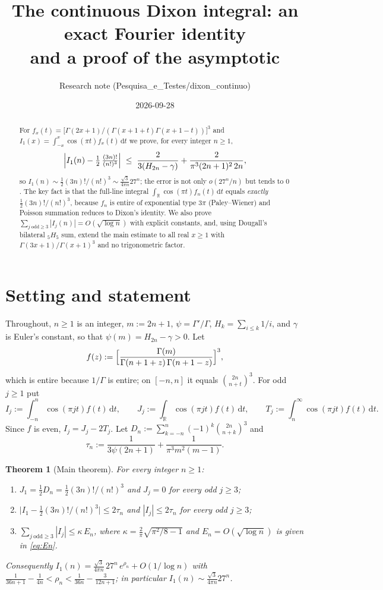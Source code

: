 \documentclass[11pt]{amsart}
\title{The continuous Dixon integral: an exact Fourier identity\\ and a proof of the asymptotic}
\author{Research note (Pesquisa\_e\_Testes/dixon\_continuo)}
\date{2026-09-28}
\newtheorem{theorem}{Theorem}[section]
\theoremstyle{remark}
\newcommand{\R}{\mathbb{R}}
\newcommand{\dd}{\,\mathrm{d}}
\begin{document}
\begin{abstract}
For $f_x(t)=\bigl[\Gamma(2x+1)/(\Gamma(x+1+t)\Gamma(x+1-t))\bigr]^3$ and
$I_1(x)=\int_{-x}^{x}\cos(\pi t)f_x(t)\dd t$ we prove, for every integer $n\ge 1$,
\[
\Bigl|I_1(n)-\tfrac12\,\tfrac{(3n)!}{(n!)^3}\Bigr|\;\le\;\frac{2}{3(H_{2n}-\gamma)}+\frac{2}{\pi^3(2n+1)^2\,2n},
\]
so $I_1(n)\sim \tfrac12 (3n)!/(n!)^3\sim \frac{\sqrt3}{4\pi n}27^n$; the error is not only $o(27^n/n)$ but tends to $0$.
The key fact is that the full-line integral $\int_\R\cos(\pi t)f_n(t)\dd t$ equals \emph{exactly} $\frac12(3n)!/(n!)^3$,
because $f_n$ is entire of exponential type $3\pi$ (Paley--Wiener) and Poisson summation reduces to Dixon's identity.
We also prove $\sum_{j\ \mathrm{odd}\ge3}|I_j(n)|=O(\sqrt{\log n})$ with explicit constants, and, using Dougall's bilateral
${}_5H_5$ sum, extend the main estimate to all real $x\ge1$ with $\Gamma(3x+1)/\Gamma(x+1)^3$ and no trigonometric factor.
\end{abstract}

\maketitle

\section{Setting and statement}

Throughout, $n\ge1$ is an integer, $m:=2n+1$, $\psi=\Gamma'/\Gamma$, $H_k=\sum_{i\le k}1/i$, and $\gamma$ is Euler's constant,
so that $\psi(m)=H_{2n}-\gamma>0$. Let
\[
f(z):=\Bigl[\frac{\Gamma(m)}{\Gamma(n+1+z)\,\Gamma(n+1-z)}\Bigr]^3 ,
\]
which is entire because $1/\Gamma$ is entire; on $[-n,n]$ it equals $\binom{2n}{n+t}^3$. For odd $j\ge1$ put
\[
I_j:=\int_{-n}^{n}\cos(\pi j t)f(t)\dd t,\qquad
J_j:=\int_{\R}\cos(\pi j t)f(t)\dd t,\qquad
T_j:=\int_{n}^{\infty}\cos(\pi j t)f(t)\dd t .
\]
Since $f$ is even, $I_j=J_j-2T_j$. Let $D_n:=\sum_{k=-n}^{n}(-1)^k\binom{2n}{n+k}^3$ and
\[
\tau_n:=\frac{1}{3\psi(2n+1)}+\frac{1}{\pi^3 m^2(m-1)} .
\]

\begin{theorem}[Main theorem]\label{thm:main}
For every integer $n\ge1$:
\begin{enumerate}
\item $J_1=\tfrac12 D_n=\tfrac12(3n)!/(n!)^3$ and $J_j=0$ for every odd $j\ge3$;
\item $\bigl|I_1-\tfrac12(3n)!/(n!)^3\bigr|\le 2\tau_n$ and $|I_j|\le 2\tau_n$ for every odd $j\ge3$;
\item $\sum_{j\ \mathrm{odd}\ge3}|I_j|\le \kappa\,E_n$, where $\kappa=\frac{2}{\pi}\sqrt{\pi^2/8-1}$ and $E_n=O(\sqrt{\log n})$ is given in \eqref{eq:En}.
\end{enumerate}
Consequently $I_1(n)=\frac{\sqrt3}{4\pi n}\,27^n\,e^{\rho_n}+O(1/\log n)$ with
$\frac{1}{36n+1}-\frac{1}{4n}<\rho_n<\frac{1}{36n}-\frac{3}{12n+1}$; in particular $I_1(n)\sim\frac{\sqrt3}{4\pi n}27^n$.
\end{theorem}
\end{document}
